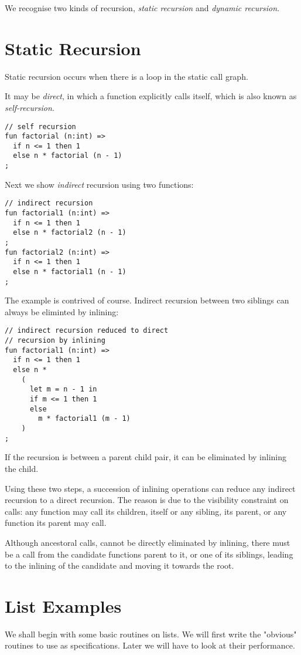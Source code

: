 \documentclass[oneside]{book}
\begin{document}
We recognise two kinds of recursion, {\em static recursion} and
{\em dynamic recursion}.

\section{Static Recursion}
Static recursion occurs when
there is a loop in the static call graph. 

It may be {\em direct}, in which
a function explicitly calls itself, which is also known as {\em self-recursion}.

\begin{verbatim}
// self recursion
fun factorial (n:int) => 
  if n <= 1 then 1
  else n * factorial (n - 1)
;
\end{verbatim}

Next we show {\em indirect} recursion using two functions:

\begin{verbatim}
// indirect recursion
fun factorial1 (n:int) => 
  if n <= 1 then 1
  else n * factorial2 (n - 1)
;
fun factorial2 (n:int) => 
  if n <= 1 then 1
  else n * factorial1 (n - 1)
;
\end{verbatim}

The example is contrived of course. 
Indirect recursion between two siblings can always be eliminted by inlining:

\begin{verbatim}
// indirect recursion reduced to direct
// recursion by inlining
fun factorial1 (n:int) => 
  if n <= 1 then 1
  else n * 
    ( 
      let m = n - 1 in
      if m <= 1 then 1 
      else
        m * factorial1 (m - 1)
    )
;
\end{verbatim}

If the recursion is between a parent child pair, it can be eliminated by
inlining the child.

Using these two steps, a succession of inlining operations
can reduce any indirect recursion to a direct recursion.
The reason is due to the visibility constraint on calls:
any function may call its children, itself or any sibling,
its parent, or any function its parent may call.

Although ancestoral calls, cannot be directly eliminated by
inlining, there must be a call from the candidate functions
parent to it, or one of its siblings, leading to the inlining
of the candidate and moving it towards the root. 

\section{List Examples}
We shall begin with some basic routines on lists.
We will first write the "obvious" routines to use as specifications.
Later we will have to look at their performance.
\end{document}
